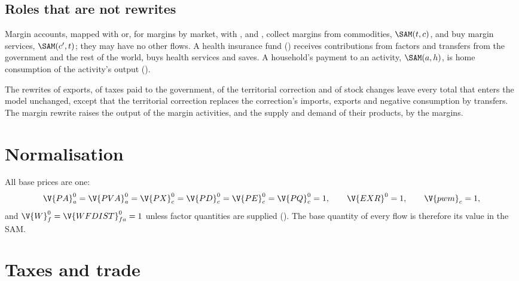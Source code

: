 \subsection{Roles that are not rewrites}

Margin accounts, mapped with  or, for margins by market,
with ,  and
, collect margins from commodities, $\SAM(t, c)$, and buy margin services,
$\SAM(c', t)$; they may have no other flows. A health insurance fund
() receives contributions from factors and transfers from the
government and the rest of the world, buys health services and saves. A
household's payment to an activity, $\SAM(a, h)$, is home consumption of the
activity's output ().

The rewrites of exports, of taxes paid to the government, of the territorial
correction and of stock changes leave every total that enters the model
unchanged, except that the territorial correction replaces the correction's
imports, exports and negative consumption by transfers. The margin rewrite
raises the output of the margin activities, and the supply and demand of
their products, by the margins.

\section{Normalisation}\label{sec:normalisation}

All base prices are one:
\begin{equation*}
\V{PA}^0_a = \V{PVA}^0_a = \V{PX}^0_c = \V{PD}^0_c = \V{PE}^0_c = \V{PQ}^0_c = 1,
\qquad \V{EXR}^0 = 1, \qquad \V{pwm}_c = 1,
\end{equation*}
and $\V{W}^0_f = \V{WFDIST}^0_{fa} = 1$ unless factor quantities are supplied
(). The base quantity of every flow is therefore
its value in the SAM.

\section{Taxes and trade}\label{sec:cal-trade}

